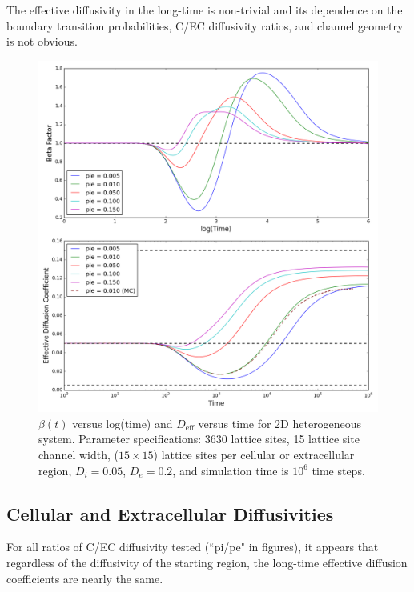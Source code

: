	The effective diffusivity in the long-time is non-trivial and its dependence on the boundary transition probabilities, C/EC diffusivity ratios, and channel geometry is not obvious.
	
	\begin{figure}[h!]
		\centering
		\includegraphics[width=1.0\linewidth]{../images/2D/pie_beta_deff_2D}
		\caption{$ \beta (t) $ versus log(time) and $ D_\textrm{eff} $ versus time for 2D heterogeneous system. Parameter specifications: 3630 lattice sites, 15 lattice site channel width, ($ 15 \times 15 $) lattice sites per cellular or extracellular region, $ D_i = 0.05 $, $ D_e = 0.2 $, and simulation time is $ 10^6 $ time steps.}
		\label{fig:pie_beta_deff_2D}
	\end{figure}

\clearpage
\subsection{Cellular and Extracellular Diffusivities}
\label{sec:2D-cellular-extracellular-diffusivities}	
	
	For all ratios of C/EC diffusivity tested (``pi/pe" in figures), it appears that regardless of the diffusivity of the starting region, the long-time effective diffusion coefficients are nearly the same.
	
